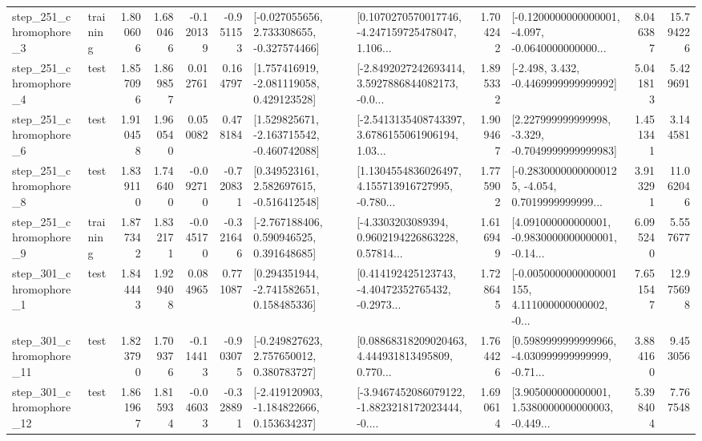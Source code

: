 \begin{tabular}{llrrrrllrlrr}
   step\_251\_chromophore\_3 &  training &      1.800606 &    1.680466 &     -0.120139 & -0.951153 &   [-0.027055656, 2.733308655, -0.327574466] &  [0.1070270570017746, -4.247159725478047, 1.106... &       1.704242 &  [-0.1200000000000001, -4.097, -0.0640000000000... &            8.046387 &         15.794226 \\
   step\_251\_chromophore\_4 &      test &      1.857096 &    1.869857 &      0.012761 &  0.164797 &    [1.757416919, -2.081119058, 0.429123528] &  [-2.8492027242693414, 3.5927886844082173, -0.0... &       1.895332 &               [-2.498, 3.432, -0.4469999999999992] &            5.041813 &          5.429691 \\
   step\_251\_chromophore\_6 &      test &      1.910458 &    1.960540 &      0.050082 &  0.478184 &   [1.529825671, -2.163715542, -0.460742088] &  [-2.5413135408743397, 3.6786155061906194, 1.03... &       1.909467 &   [2.227999999999998, -3.329, -0.7049999999999983] &            1.451341 &          3.144581 \\
   step\_251\_chromophore\_8 &      test &      1.839110 &    1.746400 &     -0.092710 & -0.720831 &    [0.349523161, 2.582697615, -0.516412548] &  [1.1304554836026497, 4.155713916727995, -0.780... &       1.775902 &  [-0.28300000000000125, -4.054, 0.7019999999999... &            3.913291 &         11.062046 \\
   step\_251\_chromophore\_9 &  training &      1.877342 &    1.832171 &     -0.045170 & -0.321646 &    [-2.767188406, 0.590946525, 0.391648685] &  [-4.3303203089394, 0.9602194226863228, 0.57814... &       1.616949 &  [4.091000000000001, -0.9830000000000001, -0.14... &            6.095240 &          5.557677 \\
   step\_301\_chromophore\_1 &      test &      1.844443 &    1.929408 &      0.084965 &  0.771087 &    [0.294351944, -2.741582651, 0.158485336] &  [0.414192425123743, -4.40472352765432, -0.2973... &       1.728645 &  [-0.0050000000000001155, 4.111000000000002, -0... &            7.651547 &         12.975698 \\
  step\_301\_chromophore\_11 &      test &      1.823790 &    1.709376 &     -0.114413 & -0.903075 &    [-0.249827623, 2.757650012, 0.380783727] &  [0.08868318209020463, 4.444931813495809, 0.770... &       1.764426 &  [0.5989999999999966, -4.030999999999999, -0.71... &            3.884160 &          9.453056 \\
  step\_301\_chromophore\_12 &      test &      1.861967 &    1.815934 &     -0.046033 & -0.328891 &   [-2.419120903, -1.184822666, 0.153634237] &  [-3.9467452086079122, -1.8823218172023444, -0.... &       1.690614 &  [3.905000000000001, 1.5380000000000003, -0.449... &            5.398404 &          7.767548 \\

\end{tabular}
